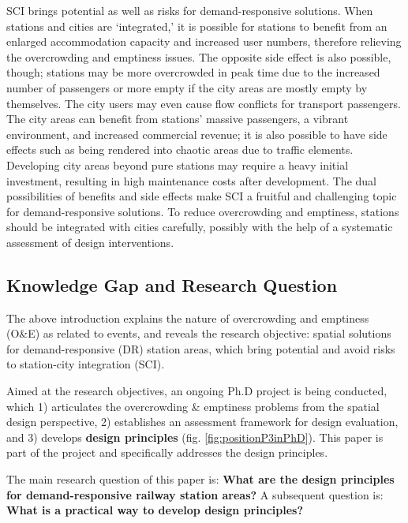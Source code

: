 \documentclass[]{article}
\begin{document}
SCI brings potential as well as risks for demand-responsive solutions. When stations and cities are `integrated,' it is possible for stations to benefit from an enlarged accommodation capacity and increased user numbers, therefore relieving the overcrowding and emptiness issues. The opposite side effect is also possible, though; stations may be more overcrowded in peak time due to the increased number of passengers or more empty if the city areas are mostly empty by themselves. The city users may even cause flow conflicts for transport passengers. The city areas can benefit from stations’ massive passengers, a vibrant environment, and increased commercial revenue; it is also possible to have side effects such as being rendered into chaotic areas due to traffic elements. Developing city areas beyond pure stations may require a heavy initial investment, resulting in high maintenance costs after development. The dual possibilities of benefits and side effects make SCI a fruitful and challenging topic for demand-responsive solutions. To reduce overcrowding and emptiness, stations should be integrated with cities carefully, possibly with the help of a systematic assessment of design interventions.



\subsection{Knowledge Gap and Research Question}
\label{Knowledge gap and research question}

The above introduction explains the nature of overcrowding and emptiness (O\&E) as related to events, and reveals the research objective: spatial solutions for demand-responsive (DR) station areas, which bring potential and avoid risks to station-city integration (SCI). 

Aimed at the research objectives, an ongoing Ph.D project is being conducted, which 1) articulates the overcrowding \& emptiness problems from the spatial design perspective, 2) establishes an assessment framework for design evaluation, and 3) develops \textbf{design principles} (fig. \ref{fig:positionP3inPhD}). This paper is part of the project and specifically addresses the design principles. 

The main research question of this paper is: \textbf{What are the design principles for demand-responsive railway station areas?} A subsequent question is:\textbf{ What is a practical way to develop design principles?} 
\end{document}
